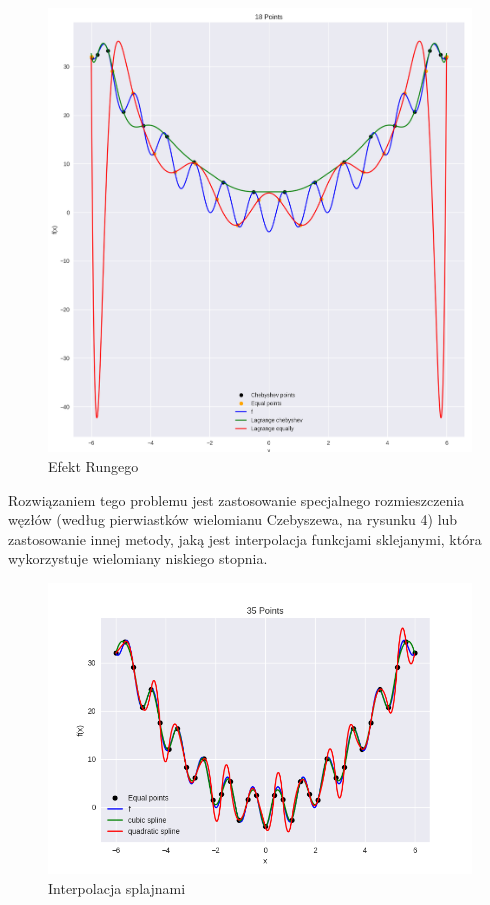 \documentclass{article}
\begin{document}
\begin{figure}[H]
    \centering
    \includegraphics[width=\textwidth]{img/lagr_18.png}
    \caption{Efekt Rungego}
\end{figure}

Rozwiązaniem tego problemu jest zastosowanie specjalnego rozmieszczenia węzłów (według pierwiastków wielomianu Czebyszewa, na rysunku 4)
lub zastosowanie innej metody, jaką jest interpolacja funkcjami sklejanymi, która wykorzystuje wielomiany niskiego stopnia.

\begin{figure}[H]
    \centering
    \includegraphics[width=\textwidth]{img/spline_35.png}
    \caption{Interpolacja splajnami}
\end{figure}
\end{document}
